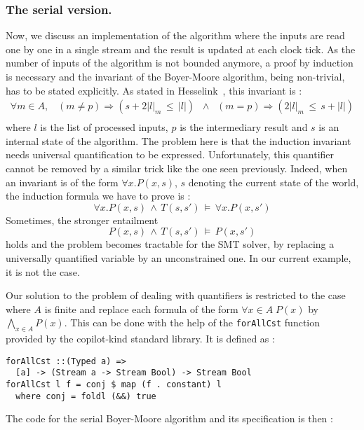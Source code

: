 \subsubsection{The serial version.} Now, we discuss an implementation
of the algorithm where the inputs are read one by one in a single
stream and the result is updated at each clock tick. As the number of
inputs of the algorithm is not bounded anymore, a proof by induction
is necessary and the invariant of the Boyer-Moore algorithm, being
non-trivial, has to be stated explicitly. As stated in
Hesselink~\cite{Hesselink2005}, this invariant is :
\[ \begin{array}{c}
\forall m \in A, \;\;\; \left(m \neq p\right) \Longrightarrow \left( s + 2|l|_m \,\leq\, |l| \right) \;\; \wedge \;\; \left(m = p\right) \Longrightarrow \left( 2|l|_m \,\leq\, s + |l| \right)
\\

\end{array} \]
where $l$ is the list of processed inputs, $p$ is the intermediary result and $s$ is an internal state of the algorithm. The problem here is that the induction invariant needs universal quantification to be expressed. Unfortunately, this quantifier cannot be removed by a similar trick like the one seen previously. Indeed, when an invariant is of the form $\forall x. P(x, s)$, $s$ denoting the current state of the world, the induction formula we have to prove is :
\[ \forall x. P(x, s) \,\wedge\, T\left(s, s' \right) \,\models\, \forall x. P(x, s') \]
Sometimes, the stronger entailment 
\[ P(x, s) \,\wedge\, T\left(s, s' \right) \,\models\, P(x, s') \]
holds and the problem becomes tractable for the SMT solver, by replacing a universally quantified variable by an unconstrained one. In our current example, it is not the case. 


Our solution to the problem of dealing with quantifiers is restricted to the
case where $A$ is finite and replace each formula of the form $\forall x \in A
\; P(x)$ by $\bigwedge_{x \in A} P(x)$. This can be done with the help of the
\texttt{forAllCst} function provided by the copilot-kind standard library. It is
defined as :
\begin{lstlisting}[frame=single]
forAllCst ::(Typed a) => 
  [a] -> (Stream a -> Stream Bool) -> Stream Bool
forAllCst l f = conj $ map (f . constant) l
  where conj = foldl (&&) true
\end{lstlisting}
The code for the serial Boyer-Moore algorithm and its specification is then :

